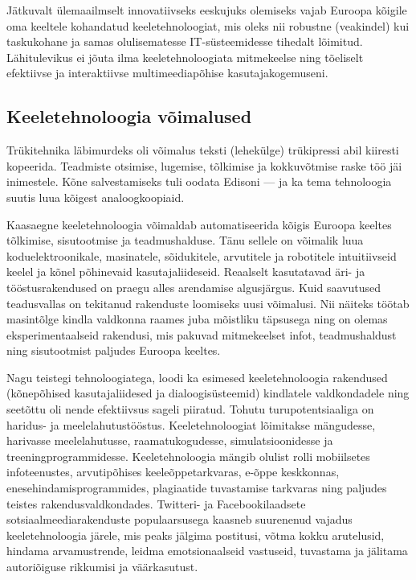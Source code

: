 \documentclass[]{../metanetpaper}
\begin{document}
\begin{multicols}{2}
Jätkuvalt ülemaailmselt innovatiivseks eeskujuks olemiseks vajab Euroopa kõigile oma keeltele kohandatud keeletehno\-loogiat, mis oleks nii robustne (veakindel) kui taskukohane ja samas olulisematesse IT-süsteemidesse tihedalt lõimitud. 
Lähi\-tulevikus ei jõuta ilma keeletehno\-loogiata mitmekeelse ning tõeliselt efektiivse ja interaktiivse multimeediapõhise kasutaja\-kogemuseni.

\subsection{Keeletehnoloogia võimalused}

Trükitehnika läbimurdeks oli võimalus teksti (lehekülge) trükipressi abil kiiresti kopeerida. 
Teadmiste otsimise, lugemise, tõlkimise ja kokkuvõtmise raske töö jäi inimestele. 
Kõne salvestamiseks tuli oodata Edisoni --- ja ka tema tehnoloogia suutis luua kõigest analoog\-koopiaid.

Kaasaegne keeletehnoloogia võimaldab automatiseerida kõigis Euroopa keeltes tõlkimise, sisutootmise ja teadmushalduse. 
Tänu sellele on võimalik luua koduelektroonikale, masinatele, sõidukitele, arvutitele ja robotitele intui\-tiivseid keelel ja kõnel põhinevaid kasutajaliideseid. 
Reaalselt kasutatavad äri- ja tööstusrakendused on praegu alles arendamise algusjärgus. 
Kuid saavutused teadusvallas on tekitanud rakenduste loo\-miseks uusi võimalusi. 
Nii näiteks töötab masintõlge kindla valdkonna raames juba mõistliku täpsusega ning on olemas eksperi\-mentaalseid rakendusi, mis pakuvad mitmekeelset infot, teadmushaldust ning sisutootmist paljudes Euroopa keeltes.

Nagu teistegi tehnoloogiatega, loodi ka esimesed keeletehnoloogia rakendused (kõnepõhised kasutajaliidesed ja dia\-loogi\-süsteemid) kindlatele valdkondadele ning seetõttu oli nende efektiivsus sageli pii\-ratud. 
Tohutu turupotentsiaaliga on haridus- ja meelelahutustööstus. 
Keele\-tehnoloogiat lõimitakse mängudesse, harivasse meelelahutusse, raamatukogudesse, simulatsioonidesse ja treeningprogrammidesse. 
Keeletehnoloogia mängib olulist rolli mobiilsetes infoteenustes, arvutipõhises keele\-õppetarkvaras, e-õppe keskkonnas, enese\-hindamisprogrammides, plagiaatide tuvastamise tarkvaras ning paljudes teistes rakendusvaldkondades. 
Twitteri- ja Facebookilaadsete sotsiaalmeediarakenduste populaarsusega kaasneb suurenenud vajadus keeletehnoloogia järele, mis peaks jälgima postitusi, võtma kokku arutelusid, hindama arvamustrende, leidma emotsionaalseid vastuseid, tuvastama ja jälitama autoriõiguse rikkumisi ja väärkasutust.


\end{multicols}
\end{document}
